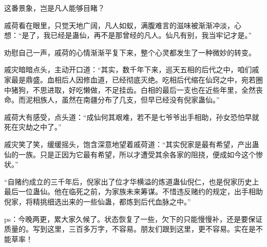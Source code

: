 \begin{this_body}
这番景象，岂是凡人能够目睹？

戚荷看在眼里，只觉天地广阔，凡人如蚁，满腹难言的滋味被渐渐冲淡，心想：“是了，我已经是蛊仙，再不是那曾经的凡人。仙凡有别，我当牢记才是。”

劝慰自己一声，戚荷的心情渐渐平复下来，整个心灵都发生了一种微妙的转变。

戚灾暗暗点头，主动开口道：“其实，数千年下来，巡天五相的后代之中，咱们戚家最是鼎盛。血相后人因修血道，已经彻底灭绝。吃相后代缩在仙窍之中，宛若圈中猪狗，不思进取，好吃懒做，不足挂齿。白相的最后一支也在近些年里，全然丧命。而泥相族人，虽然在南疆分布了几支，但早已经没有倪家蛊仙。”

戚荷大有感受，点头道：“成仙何其艰难，若不是七爷爷出手相助，孙女恐怕早就死在灾劫之中了。”

戚灾笑了笑，缓缓摇头，饱含深意地望着戚荷道：“其实倪家是最有希望，产出蛊仙的一族。只是正因为它最有希望，所以才遭受其余各家的阻挠，便成如今这个惨状。”

“自赌约成立的三千年后，倪家出了位才华横溢的炼道蛊仙倪仁，也是倪家历史上最后一位蛊仙。他在临死之前，为家族未来筹谋。不惜违反赌约的规定，出手相助倪家，将精挑细选出来的一些仙蛊，都炼到后代血脉之中。”

ps：今晚两更，累大家久候了。状态恢复了一些，欠下的只能慢慢补，还是要保证质量的。写到这里，三百多万字，不容易。朋友们跟到这里，更不容易。实在是不能草率！

\end{this_body}


